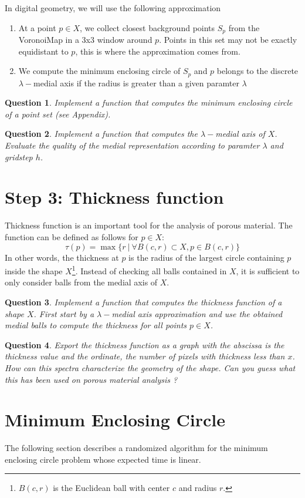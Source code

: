 \documentclass[a4paper, 11pt]{article}
\newtheorem{qu}{Question}
\begin{document}
In digital geometry, we will use the following approximation
\begin{enumerate}
\item At a point $p\in X$, we collect closest background points $S_p$
  from the VoronoiMap in a 3x3 window around $p$. Points in this set
  may not be exactly equidistant to $p$, this is where the approximation comes
  from.
\item We compute the minimum enclosing circle of $S_p$ and $p$ belongs
  to   the discrete $\lambda-$medial axis if the radius is greater
  than a given paramter $\lambda$
\end{enumerate}


\begin{qu}
  Implement a function that computes the minimum enclosing circle of a
  point set (see Appendix).
\end{qu}



\begin{qu}
  Implement a function that computes the $\lambda-$medial axis of
  $X$. Evaluate the quality of the medial representation according to
  paramter $\lambda$ and gridstep $h$.
\end{qu}

\section{Step 3: Thickness function}

Thickness function is an important tool for the analysis of porous
material. The function can be defined as follows for $p\in X$:
\begin{equation}
  \tau(p) = \max \{ r~|~ \forall B(c,r)\subset X, p\in
  B(c,r)\}
\end{equation}
In other words, the thickness at $p$ is the radius of the largest
circle containing $p$ inside the shape $X$\footnote{$B(c,r)$ is the Euclidean ball with center $c$ and
    radius $r$.}. Instead of checking all
balls contained in $X$, it is sufficient to only consider balls from
the medial axis of $X$.

\begin{qu}
  Implement a function that computes the thickness function of a shape
  $X$. First start by a $\lambda-$medial axis approximation and  use
  the obtained medial balls to compute the thickness for all points
  $p\in X$.
\end{qu}


\begin{qu}
  Export the thickness function as a graph with the abscissa is the
  thickness value and the ordinate, the number of pixels with
  thickness less than $x$. How can this spectra characterize the
  geometry of the shape. Can you guess what this has been used on
  porous material analysis ?
\end{qu}





\appendix
\section{Minimum Enclosing Circle}

The following section describes a randomized algorithm for the minimum
enclosing circle problem whose expected time is linear. 






\end{document}
